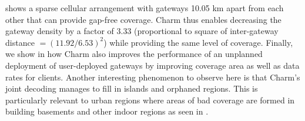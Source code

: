  shows a sparse cellular arrangement with gateways
10.05 km apart from each other that can provide gap-free coverage. Charm thus
enables decreasing the gateway density by a factor of 3.33 (proportional to
square of inter-gateway distance $=(11.92/6.53)^2$) while providing the same
level of coverage. Finally, we show in  how Charm
also improves the performance of an unplanned deployment of user-deployed
gateways by improving coverage area as well as data rates for clients. Another
interesting phenomenon to observe here is that Charm's joint decoding manages
to fill in islands and orphaned regions. This is particularly relevant to
urban regions where areas of bad coverage are formed in building basements and
other indoor regions as seen in .